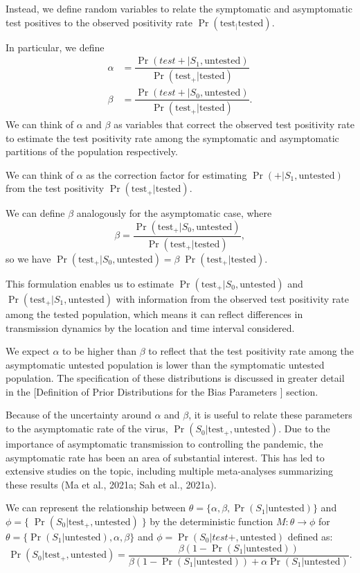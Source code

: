 \documentclass[12pt,twoside]{smiththesis}
\begin{document}
Instead, we define random variables to relate the symptomatic and asymptomatic test positives to the observed positivity rate \(\Pr(\text{test}_|\text{tested})\).

In particular, we define
\begin{align*}
\alpha &= \dfrac{\Pr(test + |S_1, \text{untested})}{\Pr(\text{test}_+ | \text{tested})}\\
\beta  &= \dfrac{\Pr(test + |S_0, \text{untested})}{\Pr(\text{test}_+ | \text{tested})}.
\end{align*}
We can think of \(\alpha\) and \(\beta\) as variables that correct the observed test positivity rate to estimate the test positivity rate among the symptomatic and asymptomatic partitions of the population respectively.

We can think of \(\alpha\) as the correction factor for estimating \(\Pr(+|S_1,\text{untested})\) from the test positivity \(\Pr(\text{test}_+ |\text{tested})\).

We can define \(\beta\) analogously for the asymptomatic case, where
\[\beta =  \dfrac{\Pr(\text{test}_+ |S_0, \text{untested})}{\Pr(\text{test}_+ | \text{tested})},\]
so we have \(\Pr(\text{test}_+ |S_0, \text{untested}) = \beta \; \Pr(\text{test}_+ | \text{tested})\).

This formulation enables us to estimate \(\Pr(\text{test}_+ |S_0, \text{untested})\) and \(\Pr(\text{test}_+ |S_1, \text{untested})\) with information from the observed test positivity rate among the tested population, which means it can reflect differences in transmission dynamics by the location and time interval considered.

We expect \(\alpha\) to be higher than \(\beta\) to reflect that the test positivity rate among the asymptomatic untested population is lower than the symptomatic untested population. The specification of these distributions is discussed in greater detail in the {[}Definition of Prior Distributions for the Bias Parameters {]} section.

Because of the uncertainty around \(\alpha\) and \(\beta\), it is useful to relate these parameters to the asymptomatic rate of the virus, \(\Pr(S_0|\text{test}_+, \text{untested})\). Due to the importance of asymptomatic transmission to controlling the pandemic, the asymptomatic rate has been an area of substantial interest. This has led to extensive studies on the topic, including multiple meta-analyses summarizing these results (Ma et al., 2021a; Sah et al., 2021a).

We can represent the relationship between \(\theta = \{ \alpha, \beta, \Pr(S_1|\text{untested})\}\) and \(\phi = \{\; \Pr(S_0|\text{test}_+, \text{untested})\;\}\) by the deterministic function
\(M: \theta \to \phi\) for \(\theta = \{\Pr(S_1|\text{untested}), \alpha, \beta \}\) and \(\phi = \Pr(S_0|test +,\text{untested})\) defined as:
\[\Pr(S_0|\text{test}_+, \text{untested}) = \dfrac{\beta(1 - \Pr(S_1|\text{untested}))}{\beta(1-\Pr(S_1|\text{untested})) + \alpha \Pr(S_1|\text{untested})}.\]
\end{document}
